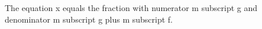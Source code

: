 The equation x equals the fraction with numerator m subscript g and denominator m subscript g plus m subscript f.